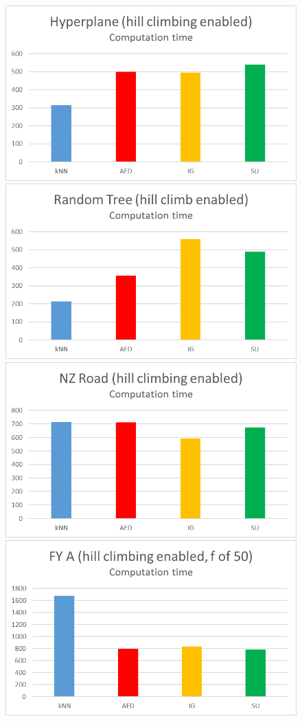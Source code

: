 \begin{figure}[h]
\includegraphics[scale=0.17]{Graphs/Hyperplane/H_time}
\includegraphics[scale=0.17]{Graphs/TreeD10/H_time}
\includegraphics[scale=0.17]{Graphs/NZRoad/H_time}
\includegraphics[scale=0.17]{Graphs/FY_A/H_time}

\end{figure}
